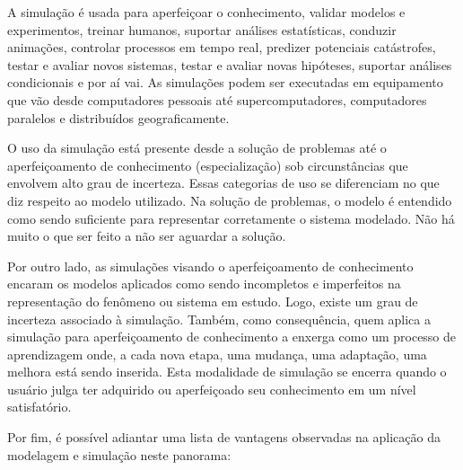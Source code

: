 \documentclass[a4paper,12pt,oneside,onecolumn]{uerj}
\begin{document}
A simulação é usada para aperfeiçoar o conhecimento, validar modelos e experimentos, treinar humanos, suportar análises estatísticas, conduzir animações, controlar processos em tempo real, predizer potenciais catástrofes, testar e avaliar novos sistemas, testar e avaliar novas hipóteses, suportar análises condicionais e por aí vai. As simulações podem ser executadas em equipamento que vão desde computadores pessoais até supercomputadores, computadores paralelos e distribuídos geograficamente.

O uso da simulação está presente desde a solução de problemas até o aperfeiçoamento de conhecimento (especialização) sob circunstâncias que envolvem alto grau de incerteza. Essas categorias de uso se diferenciam no que diz respeito ao modelo utilizado. Na solução de problemas, o modelo é entendido como sendo suficiente para representar corretamente o sistema modelado. Não há muito o que ser feito a não ser aguardar a solução.

Por outro lado, as simulações visando o aperfeiçoamento de conhecimento encaram os modelos aplicados como sendo incompletos e imperfeitos na representação do fenômeno ou sistema em estudo. Logo, existe um grau de incerteza associado à simulação. Também, como consequência, quem aplica a simulação para aperfeiçoamento de conhecimento a enxerga como um processo de aprendizagem onde, a cada nova etapa, uma mudança, uma adaptação, uma melhora está sendo inserida. Esta modalidade de simulação se encerra quando o usuário julga ter adquirido ou aperfeiçoado seu conhecimento em um nível satisfatório.

Por fim, é possível adiantar uma lista de vantagens observadas na aplicação da modelagem e simulação neste panorama:
\end{document}
